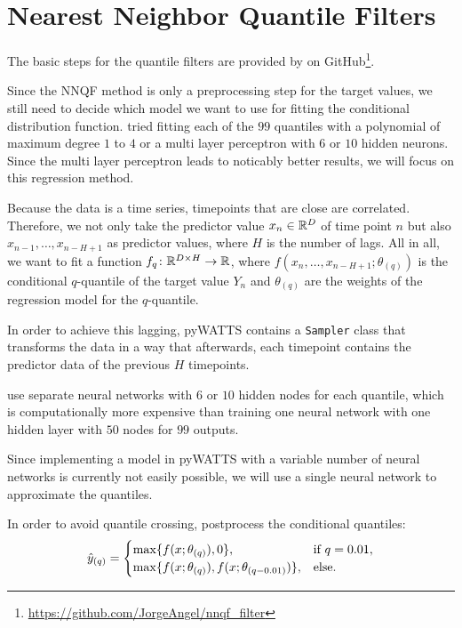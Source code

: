 \section{Nearest Neighbor Quantile Filters}
\label{sec:implementation-nnqf}

The basic steps for the quantile filters are provided by \Textcite{Ordiano2019} 
on GitHub\footnote{\url{https://github.com/JorgeAngel/nnqf_filter}}. 

Since the NNQF method is only a preprocessing step for the target values, 
we still need to decide which model we want to use for fitting the 
conditional distribution function. 
\Textcite{Ordiano2019} tried fitting each of the \(99\) quantiles 
with a polynomial of maximum degree \(1\) to \(4\) or a multi layer perceptron 
with \(6\) or \(10\) hidden neurons. Since the multi layer perceptron leads to 
noticably better results, we will focus on this regression method. 

Because the data is a time series, timepoints that are close are correlated. 
Therefore, we not only take the predictor value \(x_n \in \mathbb{R}^D\) of time point \(n\) 
but also \(x_{n-1}, \ldots, x_{n-H+1}\) as predictor values, where \(H\) is the number of lags.
All in all, we want to fit a function \(f_q\colon \mathbb{R}^{D\times H} \rightarrow \mathbb{R}\), 
where \( f(x_n, \ldots, x_{n-H+1}; \theta_{(q)})\) is the conditional 
\(q\)-quantile of the target value \(Y_n\) and \(\theta_{(q)}\) are the weights 
of the regression model for the \(q\)-quantile.

In order to achieve this lagging, pyWATTS contains a \texttt{Sampler} class
that transforms the data in a way that afterwards, each timepoint contains the 
predictor data of the previous \(H\) timepoints.

\Textcite{Ordiano2019} use separate neural networks with \(6\) or \(10\) hidden nodes for each quantile, 
which is computationally more expensive than training one neural network with 
one hidden layer with \(50\) nodes for \(99\) outputs. 

Since implementing a model in pyWATTS with a variable number of neural networks is currently 
not easily possible, we will use a single neural network to approximate the quantiles.

In order to avoid quantile crossing, \Textcite{Ordiano2019} postprocess the conditional quantiles:
\[ \hat{y}_{(q)} = \begin{cases}
    \max\{ f(x; \theta_{(q)}), 0 \}, &\text{if } q = 0.01, \\
    \max\{ f(x; \theta_{(q)}), f(x; \theta_{(q-0.01)}) \}, &\text{else.}
\end{cases}\]

